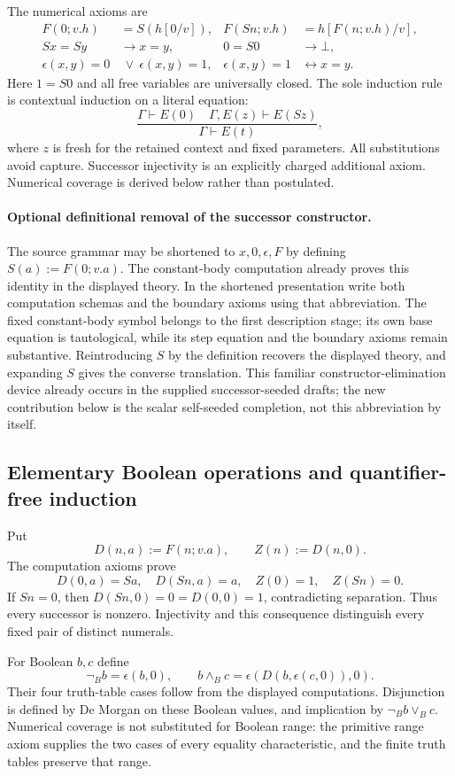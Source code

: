 \documentclass[11pt,letterpaper]{article}
\theoremstyle{definition}\newtheorem{definition}[theorem]{Definition}
\theoremstyle{remark}\newtheorem{remark}[theorem]{Remark}
\begin{document}
The numerical axioms are
\begin{align*}
F(0;v.h)&=S(h[0/v]),&F(Sn;v.h)&=h[F(n;v.h)/v],\\
Sx=Sy&\longrightarrow x=y,&0=S0&\longrightarrow\bot,\\
\epsilon(x,y)=0&\ \lor\ \epsilon(x,y)=1,&
\epsilon(x,y)=1&\longleftrightarrow x=y.
\end{align*}
Here $1=S0$ and all free variables are universally closed.
The sole induction rule is contextual induction on a literal equation:
\[
\frac{\Gamma\vdash E(0)\quad\Gamma,E(z)\vdash E(Sz)}
     {\Gamma\vdash E(t)},
\]
where $z$ is fresh for the retained context and fixed parameters.
All substitutions avoid capture. Successor injectivity is an explicitly
charged additional axiom. Numerical coverage is derived below rather
than postulated.

\paragraph{Optional definitional removal of the successor constructor.}
The source grammar may be shortened to $x,0,\epsilon,F$ by defining
$S(a):=F(0;v.a)$. The constant-body computation already proves this
identity in the displayed theory. In the shortened presentation write
both computation schemas and the boundary axioms using that abbreviation.
The fixed constant-body symbol belongs to the first description stage;
its own base equation is tautological, while its step equation and the
boundary axioms remain substantive. Reintroducing $S$ by the definition
recovers the displayed theory, and expanding $S$ gives the converse
translation. This familiar constructor-elimination device already occurs
in the supplied successor-seeded drafts; the new contribution below is
the scalar self-seeded completion, not this abbreviation by itself.

\subsection{Elementary Boolean operations and quantifier-free induction}
Put
\[
D(n,a):=F(n;v.a),\qquad Z(n):=D(n,0).
\]
The computation axioms prove
\[
D(0,a)=Sa,\quad D(Sn,a)=a,\quad Z(0)=1,\quad Z(Sn)=0.
\]
If $Sn=0$, then $D(Sn,0)=0=D(0,0)=1$, contradicting separation.
Thus every successor is nonzero. Injectivity and this consequence
distinguish every fixed pair of distinct numerals.

For Boolean $b,c$ define
\[
\neg_B b=\epsilon(b,0),\qquad
b\mathbin{\wedge_B}c=\epsilon(D(b,\epsilon(c,0)),0).
\]
Their four truth-table cases follow from the displayed computations.
Disjunction is defined by De Morgan on these Boolean values, and
implication by $\neg_Bb\vee_Bc$. Numerical coverage is not substituted
for Boolean range: the primitive range axiom supplies the two cases
of every equality characteristic, and the finite truth tables preserve
that range.
\end{document}
